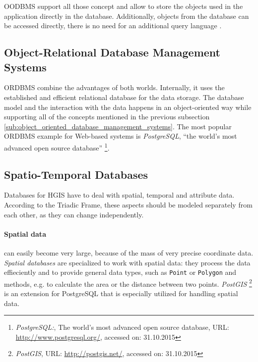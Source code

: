 OODBMS support all those concept and allow to store the objects used in the application directly in the database. Additionally, objects from the database can be accessed directly, there is no need for an additional query language \cite{oodbms}.


\subsection{Object-Relational Database Management Systems} %
\label{sub:object_relational_database_management_systems}

ORDBMS combine the advantages of both worlds. Internally, it uses the established and efficient relational database for the data storage. The database model and the interaction with the data happens in an object-oriented way while supporting all of the concepts mentioned in the previous subsection \ref{sub:object_oriented_database_management_systems}. The most popular ORDBMS example for Web-based systems is \emph{PostgreSQL}, ``the world's most advanced open source database''
\footnote{
  \emph{PostgreSQL:},
  The world's most advanced open source database,
  URL: \url{http://www.postgresql.org/},
  accessed on: 31.10.2015
}.


\subsection{Spatio-Temporal Databases} %
\label{par:spatial_databases}

Databases for HGIS have to deal with spatial, temporal and attribute data. According to the Triadic Frame, these aspects should be modeled separately from each other, as they can change independently.

\paragraph{Spatial data} %
\label{par:spatial_data}

can easily become very large, because of the mass of very precise coordinate data. \emph{Spatial databases} are specialized to work with spatial data: they process the data effieciently and to provide general data types, such as \texttt{Point} or \texttt{Polygon} and methods, e.g. to calculate the area or the distance between two points. \emph{PostGIS}
\footnote{
  \emph{PostGIS},
  URL: \url{http://postgis.net/},
  accessed on: 31.10.2015
}
is an extension for PostgreSQL that is especially utilized for handling spatial data.

